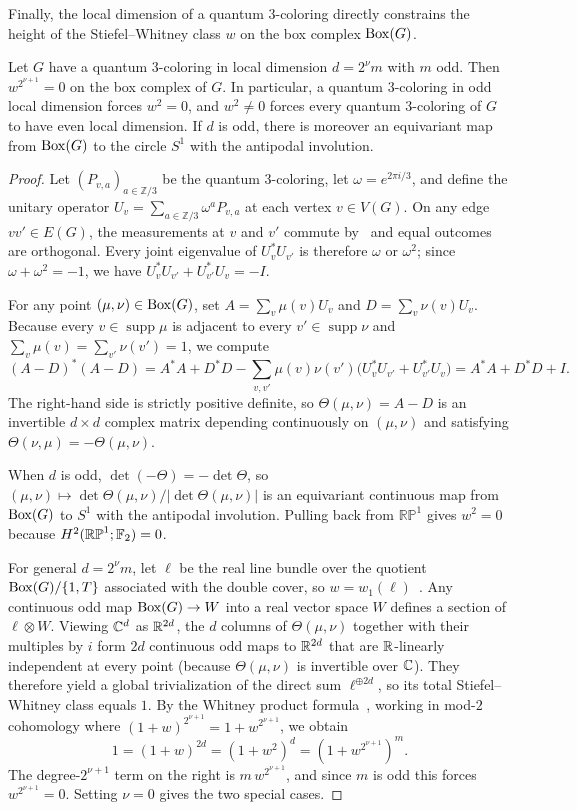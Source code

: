 Finally, the local dimension of a quantum $3$-coloring directly constrains the height of the Stiefel--Whitney class $w$ on the box complex $\operatorname{Box}(G)$.

\begin{proposition}\label{prop:height-dimension}
Let $G$ have a quantum $3$-coloring in local dimension $d=2^\nu m$ with $m$ odd. Then $w^{2^{\nu+1}}=0$ on the box complex of $G$. In particular, a quantum $3$-coloring in odd local dimension forces $w^2=0$, and $w^2\ne0$ forces every quantum $3$-coloring of $G$ to have even local dimension. If $d$ is odd, there is moreover an equivariant map from $\operatorname{Box}(G)$ to the circle $S^1$ with the antipodal involution.
\end{proposition}
\begin{proof}
Let $(P_{v,a})_{a\in\mathbb Z/3}$ be the quantum $3$-coloring, let $\omega=e^{2\pi i/3}$, and define the unitary operator $U_v=\sum_{a\in\mathbb Z/3}\omega^a P_{v,a}$ at each vertex $v\in V(G)$. On any edge $vv'\in E(G)$, the measurements at $v$ and $v'$ commute by~\cite[Lemma~2]{Ji} and equal outcomes are orthogonal. Every joint eigenvalue of $U_v^*U_{v'}$ is therefore $\omega$ or $\omega^2$; since $\omega+\omega^2=-1$, we have $U_v^*U_{v'}+U_{v'}^*U_v=-I$.

For any point $(\mu,\nu)\in\operatorname{Box}(G)$, set $A=\sum_v \mu(v)U_v$ and $D=\sum_v \nu(v)U_v$. Because every $v\in\operatorname{supp}\mu$ is adjacent to every $v'\in\operatorname{supp}\nu$ and $\sum_v \mu(v)=\sum_{v'}\nu(v')=1$, we compute
\[
 (A-D)^*(A-D)=A^*A+D^*D-\sum_{v,v'}\mu(v)\nu(v')\bigl(U_v^*U_{v'}+U_{v'}^*U_v\bigr)=A^*A+D^*D+I.
\]
The right-hand side is strictly positive definite, so $\Theta(\mu,\nu)=A-D$ is an invertible $d\times d$ complex matrix depending continuously on $(\mu,\nu)$ and satisfying $\Theta(\nu,\mu)=-\Theta(\mu,\nu)$.

When $d$ is odd, $\det(-\Theta)=-\det\Theta$, so $(\mu,\nu)\mapsto\det\Theta(\mu,\nu)/|\det\Theta(\mu,\nu)|$ is an equivariant continuous map from $\operatorname{Box}(G)$ to $S^1$ with the antipodal involution. Pulling back from $\mathbb{RP}^1$ gives $w^2=0$ because $H^2(\mathbb{RP}^1;\mathbb F_2)=0$.

For general $d=2^\nu m$, let $\ell$ be the real line bundle over the quotient $\operatorname{Box}(G)/\{1,T\}$ associated with the double cover, so $w=w_1(\ell)$~\cite{MS}. Any continuous odd map $\operatorname{Box}(G)\to W$ into a real vector space $W$ defines a section of $\ell\otimes W$. Viewing $\mathbb C^d$ as $\mathbb R^{2d}$, the $d$ columns of $\Theta(\mu,\nu)$ together with their multiples by $i$ form $2d$ continuous odd maps to $\mathbb R^{2d}$ that are $\mathbb R$-linearly independent at every point (because $\Theta(\mu,\nu)$ is invertible over $\mathbb C$). They therefore yield a global trivialization of the direct sum $\ell^{\oplus 2d}$, so its total Stiefel--Whitney class equals $1$. By the Whitney product formula~\cite{MS}, working in mod-$2$ cohomology where $(1+w)^{2^{\nu+1}}=1+w^{2^{\nu+1}}$, we obtain
\[
 1=(1+w)^{2d}=(1+w^2)^d=(1+w^{2^{\nu+1}})^m.
\]
The degree-$2^{\nu+1}$ term on the right is $m\,w^{2^{\nu+1}}$, and since $m$ is odd this forces $w^{2^{\nu+1}}=0$. Setting $\nu=0$ gives the two special cases.
\end{proof}

